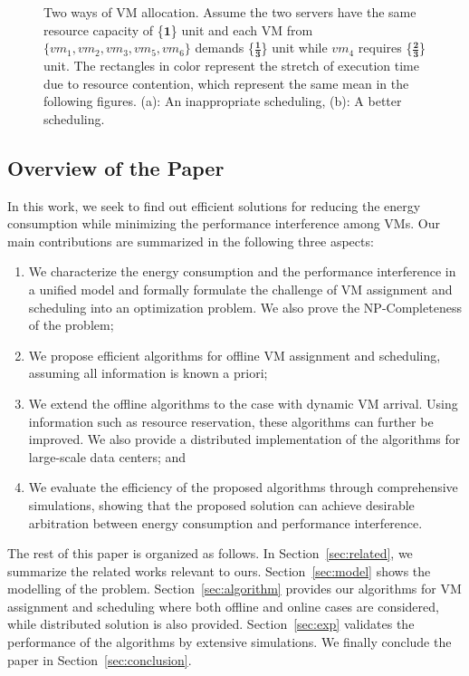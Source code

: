 \documentclass[10pt,journal]{IEEEtran}
\begin{document}
\begin{figure}
\begin{tikzpicture}
\end{tikzpicture}
\caption{\label{fig:example_allocation}Two ways of VM allocation. Assume the two servers have the same resource capacity of \{$\bm{1}$\} unit and each VM from $\{vm_1,vm_2,vm_3,vm_5,vm_6\}$ demands \{$\bm{\frac{1}{3}}$\} unit while $vm_4$ requires \{$\bm{\frac{2}{3}}$\} unit. The rectangles in color represent the stretch of execution time due to resource contention, which represent the same mean in the following figures. (a): An inappropriate scheduling, (b): A better scheduling.}
\end{figure}

\subsection{Overview of the Paper}

In this work, we seek to find out efficient solutions for reducing the energy consumption while minimizing the performance interference among VMs. Our main contributions are summarized in the following three aspects:
\begin{enumerate}
\item We characterize the energy consumption and the performance interference in a unified model and  formally formulate the challenge of VM assignment and scheduling into an optimization problem. We also prove the NP-Completeness of the problem;
\item We propose efficient algorithms for offline VM assignment and scheduling, assuming all information is known a priori;
\item We extend the offline algorithms to the case with dynamic VM arrival. Using information such as resource reservation, these algorithms can further be improved. We also provide a distributed implementation of the algorithms for large-scale data centers; and
\item We evaluate the efficiency of the proposed algorithms through comprehensive simulations, showing that the proposed solution can achieve desirable arbitration between energy consumption and performance interference.
\end{enumerate}

The rest of this paper is organized as follows. In Section~\ref{sec:related}, we summarize the related works relevant to ours. Section~\ref{sec:model} shows the modelling of the problem. Section~\ref{sec:algorithm} provides our algorithms for VM assignment and scheduling where both offline and online cases are considered, while distributed solution is also provided. Section~\ref{sec:exp} validates the performance of the algorithms by extensive simulations. We finally conclude the paper in Section~\ref{sec:conclusion}.
\end{document}
